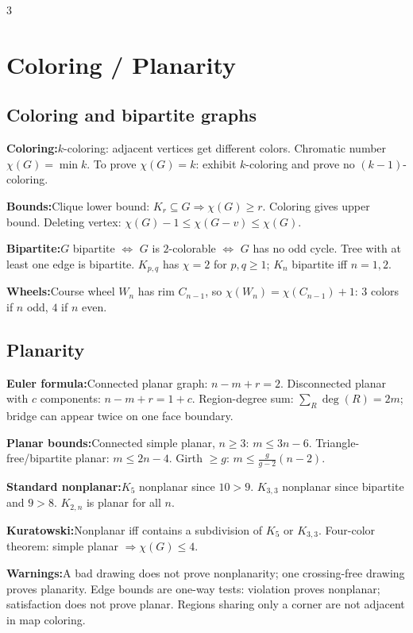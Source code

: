 \documentclass[10pt]{article}
\newenvironment{cheatitems}{\par\vspace{-1pt}}{\par\vspace{-1pt}}
\newcommand{\cheatrow}[2]{\par\noindent\textbf{#1:}\enspace #2\par}
\begin{document}
\begin{multicols}{3}
\section*{Coloring / Planarity}
\subsection*{Coloring and bipartite graphs}
\begin{cheatitems}
\cheatrow{Coloring}{$k$-coloring: adjacent vertices get different colors. Chromatic number $\chi(G)=\min k$. To prove $\chi(G)=k$: exhibit $k$-coloring and prove no $(k-1)$-coloring.}
\cheatrow{Bounds}{Clique lower bound: $K_r\subseteq G\Rightarrow\chi(G)\ge r$. Coloring gives upper bound. Deleting vertex: $\chi(G)-1\le\chi(G-v)\le\chi(G)$.}
\cheatrow{Bipartite}{$G$ bipartite $\iff$ $G$ is $2$-colorable $\iff$ $G$ has no odd cycle. Tree with at least one edge is bipartite. $K_{p,q}$ has $\chi=2$ for $p,q\ge1$; $K_n$ bipartite iff $n=1,2$.}
\cheatrow{Wheels}{Course wheel $W_n$ has rim $C_{n-1}$, so $\chi(W_n)=\chi(C_{n-1})+1$: $3$ colors if $n$ odd, $4$ if $n$ even.}
\end{cheatitems}

\subsection*{Planarity}
\begin{cheatitems}
\cheatrow{Euler formula}{Connected planar graph: $n-m+r=2$. Disconnected planar with $c$ components: $n-m+r=1+c$. Region-degree sum: $\sum_R\deg(R)=2m$; bridge can appear twice on one face boundary.}
\cheatrow{Planar bounds}{Connected simple planar, $n\ge3$: $m\le3n-6$. Triangle-free/bipartite planar: $m\le2n-4$. Girth $\ge g$: $m\le\frac{g}{g-2}(n-2)$.}
\cheatrow{Standard nonplanar}{$K_5$ nonplanar since $10>9$. $K_{3,3}$ nonplanar since bipartite and $9>8$. $K_{2,n}$ is planar for all $n$.}
\cheatrow{Kuratowski}{Nonplanar iff contains a subdivision of $K_5$ or $K_{3,3}$. Four-color theorem: simple planar $\Rightarrow\chi(G)\le4$.}
\cheatrow{Warnings}{A bad drawing does not prove nonplanarity; one crossing-free drawing proves planarity. Edge bounds are one-way tests: violation proves nonplanar; satisfaction does not prove planar. Regions sharing only a corner are not adjacent in map coloring.}
\end{cheatitems}


\end{multicols}
\end{document}
